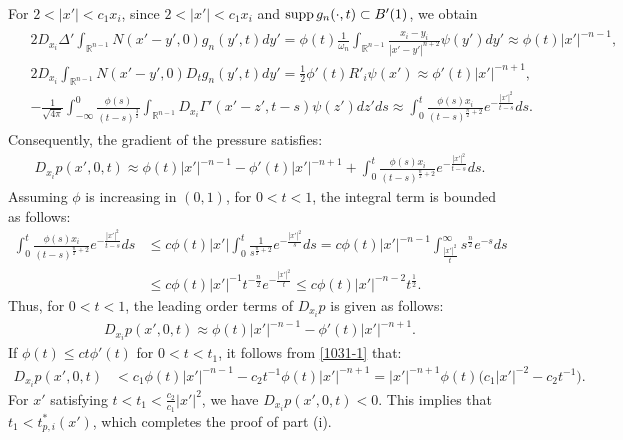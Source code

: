 \documentclass{amsart}
\numberwithin{equation}{section}
\newcommand{\om}{{ \omega  }}
\newcommand{\Rn}{{\mathbb R}^{n-1}}
\newcommand{\De}{\Delta}
\newcommand{\Ga}{\Gamma}
\begin{document}
For $2 < |x'| < c_1 x_i$, since   $2 < |x'| < c_1 x_i$ and ${\rm supp} \, g_n(\cdot, t) \subset B'(1)$, we obtain
\begin{align}\label{0223-6}
\begin{split}
& 2D_{x_i} \De'\int_{\Rn} N(x' -y', 0) g_n (y', t) dy'  = \phi(t) \frac1{\om_n} \int_{\Rn} \frac{x_i -y_i}{|x' -y'|^{n+2}} \psi(y') dy' \approx  \phi(t)|x'|^{-n -1},\\
& 2 D_{x_i} \int_{\Rn} N(x' -y', 0)  D_t g_n (y', t) dy'  = \frac12  \phi' (t) R'_i \psi(x') \approx \phi' (t) |x'|^{-n +1},\\
 & - \frac{1}{\sqrt{4 \pi}} \int_{-\infty}^0 \frac{\phi( s)  }{(t -s)^{\frac{3}{2}}} 
  \int_{\Rn} D_{x_i} \Ga' (x' -z', t-s) \psi(z') dz' ds  \approx \int_0^t \frac{\phi (s) x_i}{(t-s)^{\frac{n}{2} +2}} e^{-\frac{|x'|^2}{t-s}} ds.
\end{split}
\end{align}
Consequently, the gradient of the pressure satisfies:
\begin{align*}
D_{x_i} p(x', 0,t) \approx \phi(t)|x'|^{-n -1}  - \phi' (t) |x'|^{-n +1} + \int_0^t \frac{\phi (s) x_i}{(t-s)^{\frac{n}{2} +2}} e^{-\frac{|x'|^2}{t-s}} ds.
\end{align*}
Assuming $\phi$ is increasing in $(0, 1)$, for $0 < t < 1$, the integral term is bounded as follows:
\begin{align*}
\int_0^t \frac{\phi (s) x_i}{(t-s)^{\frac{n}{2} +2}} e^{-\frac{|x'|^2}{t-s}} ds &\leq c  \phi(t) |x'| \int_0^t \frac{1}{s^{\frac{n}{2} +2}} e^{-\frac{|x'|^2}{ s}} ds
 = c  \phi(t) |x'|^{-n -1} \int_{\frac{|x'|^2}t}^\infty s^{\frac{n}2}    e^{-s} ds\\
& \leq  c  \phi(t) |x'|^{-1}  t^{-\frac{n}2} e^{-\frac{|x'|^2}t}    \leq  c  \phi(t) |x'|^{-n-2}  t^{\frac{1}2}.
\end{align*}
Thus, for $0 < t < 1$, the leading order terms of $D_{x_i} p$ is given as follows:
\begin{align}\label{1031-1}
D_{x_i} p(x', 0,t) \approx \phi(t)|x'|^{-n -1}  - \phi' (t) |x'|^{-n +1}.
\end{align}
If $\phi(t) \leq c t \phi'(t)$ for $0 < t < t_1$, it follows from \eqref{1031-1} that:
  \begin{align*} 
  D_{x_i} p(x', 0,t)& <  c_1 \phi (t)  |x'|^{-n -1}   - c_2 t^{-1} \phi(t)  |x'|^{-n +1}   = |x'|^{-n +1} \phi(t) \big( c_1 |x'|^{-2}-  c_2    t^{-1}   \big). \label{eq_proof1}
  \end{align*}
  For $x'$ satisfying $t < t_1 < \frac{c_2}{c_1} |x'|^{2}$, we have $D_{x_i} p(x', 0,t) < 0$. This  implies that $t_1 < t_{p,i}^* (x')$, which completes the proof of part (i). 
\end{document}
